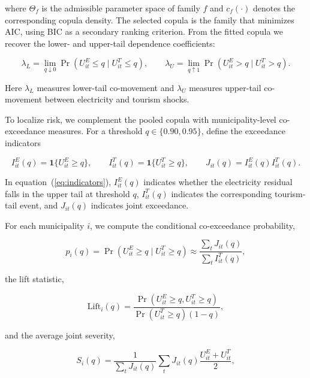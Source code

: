 \documentclass[11pt,a4paper]{article}
\begin{document}
where $\Theta_f$ is the admissible parameter space of family $f$ and $c_f(\cdot)$ denotes the corresponding copula density. The selected copula is the family that minimizes AIC, using BIC as a secondary ranking criterion. From the fitted copula we recover the lower- and upper-tail dependence coefficients:

\begin{equation}
\label{eq:taildep}
\lambda_L = \lim_{q \downarrow 0} \Pr(U^E_{it} \le q \mid U^T_{it} \le q), \qquad
\lambda_U = \lim_{q \uparrow 1} \Pr(U^E_{it} > q \mid U^T_{it} > q).
\end{equation}

Here $\lambda_L$ measures lower-tail co-movement and $\lambda_U$ measures upper-tail co-movement between electricity and tourism shocks.

To localize risk, we complement the pooled copula with municipality-level co-exceedance measures. For a threshold $q \in \{0.90, 0.95\}$, define the exceedance indicators

\begin{equation}
\label{eq:indicators}
I^E_{it}(q) = \mathbf{1}\{U^E_{it} \ge q\}, \qquad I^T_{it}(q) = \mathbf{1}\{U^T_{it} \ge q\}, \qquad J_{it}(q) = I^E_{it}(q) I^T_{it}(q).
\end{equation}

In equation~(\ref{eq:indicators}), $I^E_{it}(q)$ indicates whether the electricity residual falls in the upper tail at threshold $q$, $I^T_{it}(q)$ indicates the corresponding tourism-tail event, and $J_{it}(q)$ indicates joint exceedance.

For each municipality $i$, we compute the conditional co-exceedance probability,

\begin{equation}
\label{eq:piq}
p_i(q) = \Pr\left(U^E_{it} \ge q \mid U^T_{it} \ge q\right) \approx \frac{\sum_t J_{it}(q)}{\sum_t I^T_{it}(q)},
\end{equation}

the lift statistic,

\begin{equation}
\label{eq:lift}
\mathrm{Lift}_i(q) = \frac{\Pr(U^E_{it} \ge q, U^T_{it} \ge q)}{\Pr(U^T_{it} \ge q)(1-q)},
\end{equation}

and the average joint severity,

\begin{equation}
\label{eq:severity}
S_i(q) = \frac{1}{\sum_t J_{it}(q)} \sum_t J_{it}(q) \frac{U^E_{it} + U^T_{it}}{2},
\end{equation}
\end{document}
